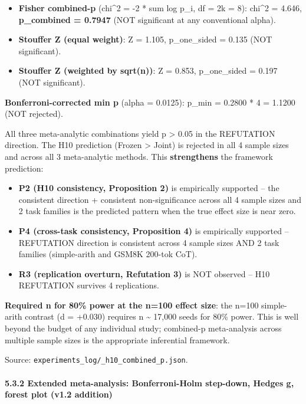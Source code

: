 \documentclass[
]{article}
\providecommand{\tightlist}{%
  \setlength{\itemsep}{0pt}\setlength{\parskip}{0pt}}
\begin{document}
\begin{itemize}
\tightlist
\item
  \textbf{Fisher combined-p} (chi\^{}2 = -2 * sum log p\_i, df = 2k =
  8): chi\^{}2 = 4.646, \textbf{p\_combined = 0.7947} (NOT significant
  at any conventional alpha).
\item
  \textbf{Stouffer Z (equal weight)}: Z = 1.105, p\_one\_sided = 0.135
  (NOT significant).
\item
  \textbf{Stouffer Z (weighted by sqrt(n))}: Z = 0.853, p\_one\_sided =
  0.197 (NOT significant).
\end{itemize}

\textbf{Bonferroni-corrected min p} (alpha = 0.0125): p\_min = 0.2800 *
4 = 1.1200 (NOT rejected).

All three meta-analytic combinations yield p \textgreater{} 0.05 in the
REFUTATION direction. The H10 prediction (Frozen \textgreater{} Joint)
is rejected in all 4 sample sizes and across all 3 meta-analytic
methods. This \textbf{strengthens} the framework prediction:

\begin{itemize}
\tightlist
\item
  \textbf{P2 (H10 consistency, Proposition 2)} is empirically supported
  -- the consistent direction + consistent non-significance across all 4
  sample sizes and 2 task families is the predicted pattern when the
  true effect size is near zero.
\item
  \textbf{P4 (cross-task consistency, Proposition 4)} is empirically
  supported -- REFUTATION direction is consistent across 4 sample sizes
  AND 2 task families (simple-arith and GSM8K 200-tok CoT).
\item
  \textbf{R3 (replication overturn, Refutation 3)} is NOT observed --
  H10 REFUTATION survives 4 replications.
\end{itemize}

\textbf{Required n for 80\% power at the n=100 effect size}: the n=100
simple-arith contrast (d = +0.030) requires n \textasciitilde{} 17,000
seeds for 80\% power. This is well beyond the budget of any individual
study; combined-p meta-analysis across multiple sample sizes is the
appropriate inferential framework.

Source: \texttt{experiments\_log/\_h10\_combined\_p.json}.

\paragraph{5.3.2 Extended meta-analysis: Bonferroni-Holm step-down,
Hedges g, forest plot (v1.2
addition)}\label{extended-meta-analysis-bonferroni-holm-step-down-hedges-g-forest-plot-v1.2-addition}
\end{document}
